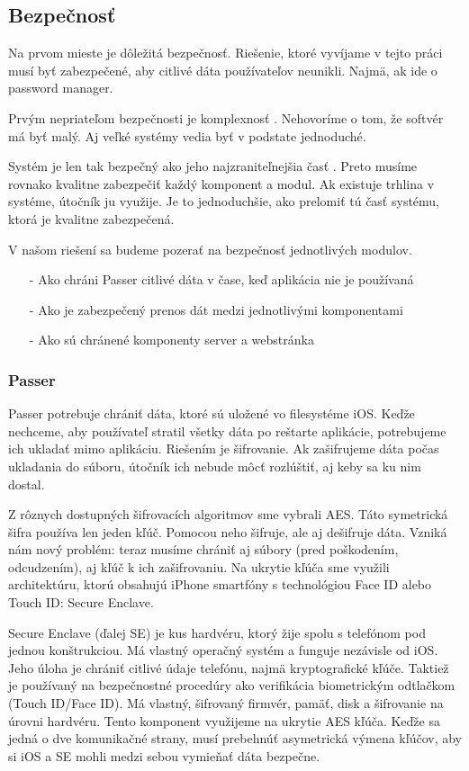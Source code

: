 \subsection{Bezpečnosť}
Na prvom mieste je dôležitá bezpečnosť. Riešenie, ktoré vyvíjame v tejto práci musí byť zabezpečené, aby citlivé dáta používateľov neunikli. Najmä, ak ide o password manager.

Prvým nepriateľom bezpečnosti je komplexnosť \cite{practicalcryptography}. Nehovoríme o tom, že softvér má byť malý. Aj veľké systémy vedia byť v podstate jednoduché. 

Systém je len tak bezpečný ako jeho najzraniteľnejšia časť \cite{practicalcryptography}. Preto musíme rovnako kvalitne zabezpečiť každý komponent a modul. Ak existuje trhlina v systéme, útočník ju využije. Je to jednoduchšie, ako prelomiť tú časť systému, ktorá je kvalitne zabezpečená. 

V našom riešení sa budeme pozerať na bezpečnosť jednotlivých modulov.
\begin{itemize}
    \item[-] Ako chráni Passer citlivé dáta v čase, keď aplikácia nie je používaná
    \item[-] Ako je zabezpečený prenos dát medzi jednotlivými komponentami
    \item[-] Ako sú chránené komponenty server a webstránka
\end{itemize}

\subsubsection{Passer}
Passer potrebuje chrániť dáta, ktoré sú uložené vo filesystéme iOS. Keďže nechceme, aby používateľ stratil všetky dáta po reštarte aplikácie, potrebujeme ich ukladať mimo aplikáciu. Riešením je šifrovanie. Ak zašifrujeme dáta počas ukladania do súboru, útočník ich nebude môcť rozlúštiť, aj keby sa ku nim dostal. 

Z rôznych dostupných šifrovacích algoritmov sme vybrali 
AES. Táto symetrická šifra používa len jeden kľúč. Pomocou neho šifruje, ale aj dešifruje dáta. Vzniká nám nový problém: teraz musíme chrániť aj súbory (pred poškodením, odcudzením), aj kľúč k ich zašifrovaniu. Na ukrytie kľúča sme využili architektúru, ktorú obsahujú iPhone smartfóny s technológiou Face ID alebo Touch ID: Secure Enclave.

Secure Enclave (ďalej SE) je kus hardvéru, ktorý žije spolu s telefónom pod jednou konštrukciou. Má vlastný operačný systém a funguje nezávisle od iOS. Jeho úloha je chrániť citlivé údaje telefónu, najmä kryptografické kľúče. Taktiež je používaný na bezpečnostné procedúry ako verifikácia biometrickým odtlačkom \cite{secureenclave} (Touch ID/Face ID). Má vlastný, šifrovaný firmvér, pamäť, disk a šifrovanie na úrovni hardvéru. Tento komponent využijeme na ukrytie AES kľúča. Keďže sa jedná o dve komunikačné strany, musí prebehnúť asymetrická výmena kľúčov, aby si iOS a SE mohli medzi sebou vymieňať dáta bezpečne. 


